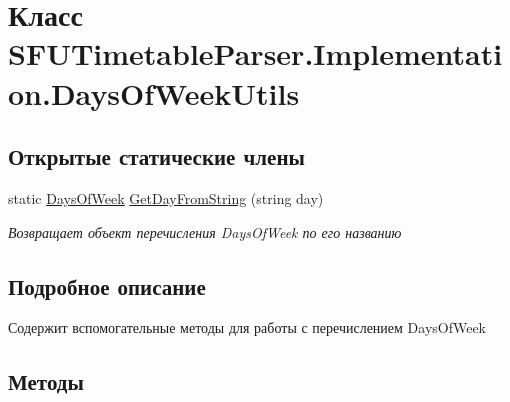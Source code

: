 \hypertarget{class_s_f_u_timetable_parser_1_1_implementation_1_1_days_of_week_utils}{}\section{Класс S\+F\+U\+Timetable\+Parser.\+Implementation.\+Days\+Of\+Week\+Utils}
\label{class_s_f_u_timetable_parser_1_1_implementation_1_1_days_of_week_utils}
\subsection*{Открытые статические члены}
\begin{DoxyCompactItemize}
\item 
static \hyperlink{namespace_s_f_u_timetable_parser_1_1_core_1_1_entities_a24625cfb0f8355baf5eebfe2032c4169}{Days\+Of\+Week} \hyperlink{class_s_f_u_timetable_parser_1_1_implementation_1_1_days_of_week_utils_a1e1833fbf357b1b287bfb5192733f732}{Get\+Day\+From\+String} (string day)
\begin{DoxyCompactList}\small\item\em Возвращает объект перечисления Days\+Of\+Week по его названию \end{DoxyCompactList}\end{DoxyCompactItemize}


\subsection{Подробное описание}
Содержит вспомогательные методы для работы с перечислением Days\+Of\+Week 

\subsection{Методы}
\mbox{\label{class_s_f_u_timetable_parser_1_1_implementation_1_1_days_of_week_utils_a1e1833fbf357b1b287bfb5192733f732}} 
